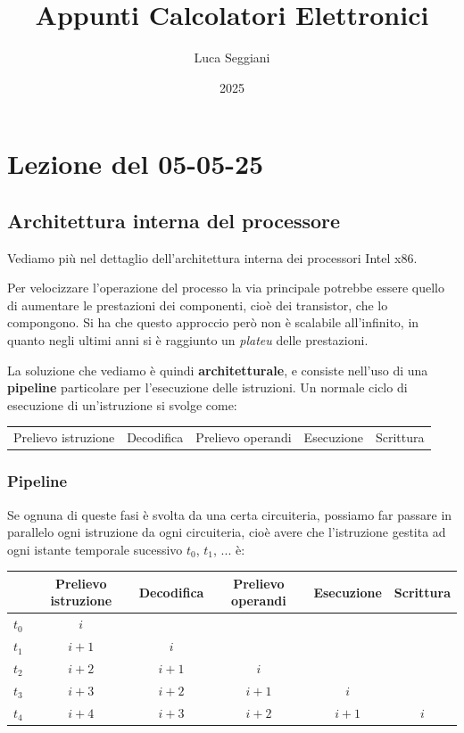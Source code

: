 \documentclass[a4paper,11pt]{article}
\title{Appunti Calcolatori Elettronici}
\author{Luca Seggiani}
\date{2025}
\begin{document}
\section{Lezione del 05-05-25}

\thispagestyle{empty}
\pagestyle{fancy}

\subsection{Architettura interna del processore}
Vediamo più nel dettaglio dell'architettura interna dei processori Intel x86.

Per velocizzare l'operazione del processo la via principale potrebbe essere quello di aumentare  le prestazioni dei componenti, cioè dei transistor, che lo compongono.
Si ha che questo approccio però non è scalabile all'infinito, in quanto negli ultimi anni si è raggiunto un \textit{plateu} delle prestazioni.

La soluzione che vediamo è quindi \textbf{architetturale}, e consiste nell'uso di una \textbf{pipeline} particolare per l'esecuzione delle istruzioni.
Un normale ciclo di esecuzione di un'istruzione si svolge come:

\begin{table}[h!]
	\center {}
	\begin{tabular} { c | c | c | c | c }
		\sffamily Prelievo istruzione & \sffamily Decodifica & \sffamily Prelievo operandi & \sffamily Esecuzione & \sffamily Scrittura
	\end{tabular}
\end{table}

\subsubsection{Pipeline}
Se ognuna di queste fasi è svolta da una certa circuiteria, possiamo far passare in parallelo ogni istruzione da ogni circuiteria, cioè avere che l'istruzione gestita ad ogni istante temporale sucessivo $t_0$, $t_1$, ... è:

\begin{table}[h!]
	\center {}
	\begin{tabular} { c |c | c | c | c | c }
		& \sffamily Prelievo istruzione & \sffamily Decodifica & \sffamily Prelievo operandi & \sffamily Esecuzione & \sffamily Scrittura \\
		\hline
		$t_0$ & $i$ & & & & \\
		$t_1$ & $i + 1$ & $i$ & & & \\
		$t_2$ & $i + 2$ & $i + 1$ & $i$ & &  \\
		$t_3$ & $i + 3$ & $i + 2$ & $i + 1$ & $i$ & \\
		$t_4$ & $i + 4$ & $i + 3$ & $i + 2$ & $i + 1$ & $i$ \\
	\end{tabular}
\end{table}
\end{document}
